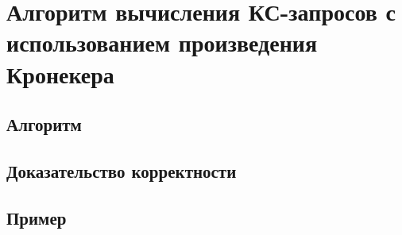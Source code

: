 \chapter{Алгоритм вычисления КС-запросов с использованием произведения Кронекера}\label{ch:ch4}

\section{Алгоритм}\label{sec:ch4/sect1}
\section{Доказательство корректности}\label{sec:ch4/sect2}
\section{Пример}\label{sec:ch4/sect3}

\clearpage

